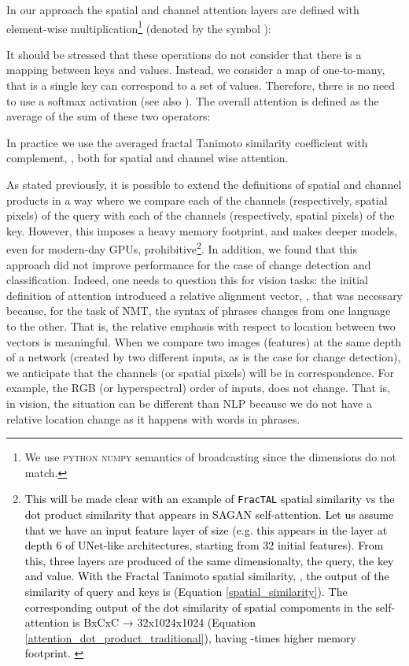 \documentclass[times, 5p]{elsarticle}
\def \FracTAL {\texttt{FracTAL} }
\begin{document}
In our approach the spatial and channel attention layers are  defined with element-wise multiplication\footnote{We use \textsc{python numpy} \citep{oliphant2006guide} semantics of broadcasting since the dimensions do not match.} (denoted by the symbol ): 

It should be stressed that these operations do not consider that there is a  mapping between keys and values. Instead, we consider a map of one-to-many, that is a single key can correspond to a set of values. Therefore, there is no need to use a softmax activation (see also \citealt{DBLP:journals/corr/KimDHR17}). The overall attention is defined as the average of the sum of these two operators: 

In practice we use the averaged fractal Tanimoto similarity coefficient with complement, ,  both for spatial and channel wise attention.  

As stated previously, it is possible to extend the definitions of spatial and channel products in a way where we compare each of the channels (respectively, spatial pixels) of the query with each of the channels (respectively, spatial pixels) of the key. However, this imposes a heavy memory footprint, and makes deeper models, even for modern-day GPUs, prohibitive\footnote{\textcolor{black}{This will be made clear with an example of \FracTAL spatial similarity vs the dot product similarity that appears in SAGAN \citep{zhang2018selfattention} self-attention.  Let us assume that we have an input  feature layer of size  (e.g. this appears in the layer at depth 6 of UNet-like architectures, starting from 32 initial features). From this, three layers are produced of the same dimensionalty, the query, the key and value. With the  Fractal Tanimoto spatial similarity, , the output of the similarity of query and keys is  (Equation \ref{spatial_similarity}). The corresponding output of the dot similarity of spatial compoments in the self-attention is BxCxC → 32x1024x1024 (Equation \ref{attention_dot_product_traditional}), having -times higher memory footprint. }}. In addition, we found that this approach did not improve performance  for the case of change detection and classification.  Indeed, one needs to question this for vision tasks: the initial definition of attention \citep{bahdanau2014neural} introduced a relative alignment vector, , that was necessary because, for the task of NMT, the syntax of phrases changes from one language to the other. That is, the relative emphasis with respect to  location between two vectors is meaningful.  When we compare two images (features) at the same depth of a network (created by two different inputs, as is the case for change detection), we anticipate that the channels (or spatial pixels) will be in correspondence. For example, the RGB (or hyperspectral) order of inputs, does not change. 
That is,  in vision, the situation can be different than NLP because we do not have a relative location change as it happens with words in phrases.
\end{document}

